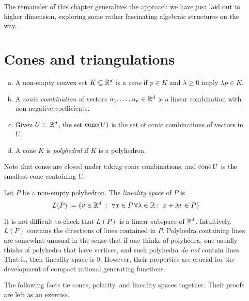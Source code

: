 The remainder of this chapter generalizes the approach we have just laid out to higher dimension,
exploring some rather fascinating algebraic structures on the way.



\section{Cones and triangulations}

\begin{definition}
  \begin{enumerate}[(a)]
    \item A non-empty convex set $K \subseteq \mathbb{R}^d$ is a \emph{cone}
      if $p \in K$ and $\lambda \geq 0$ imply $\lambda p \in K$.
  
    \item A \emph{conic combination} of vectors $u_1, \ldots, u_n \in \mathbb{R}^d$ is
      a linear combination with non-negative coefficients.
  
    \item Given $U \subset \mathbb{R}^d$, the set $\operatorname{cone}(U)$ is the set of conic combinations of vectors in $U$.
  
    \item A cone $K$ is \emph{polyhedral} if $K$ is a polyhedron.
  \end{enumerate}
\end{definition}

Note that cones are closed under taking conic combinations,
and $\operatorname{cone}{U}$ is the smallest cone containing $U$.

\begin{definition}
  Let $P$ be a non-empty polyhedron.
  The \emph{lineality space} of $P$ is
  \[
    L(P) := \{ v \in \mathbb{R}^d ~:~ \forall x\in P \,\forall \lambda \in \mathbb{R}:~ x + \lambda v \in P  \}
  \]
\end{definition}

It is not difficult to check that $L(P)$ is a linear subspace of $\mathbb{R}^d$.
Intuitively, $L(P)$ contains the directions of lines contained in $P$.
Polyhedra containing lines are somewhat unusual in the sense
that if one thinks of polyhedra, one usually thinks of polyhedra that have vertices,
and such polyhedra \emph{do not} contain lines.
That is, their lineality space is $0$.
However, their properties are crucial for the development of compact rational generating functions.

The following facts tie cones, polarity, and lineality spaces together.
Their proofs are left as an exercise.

